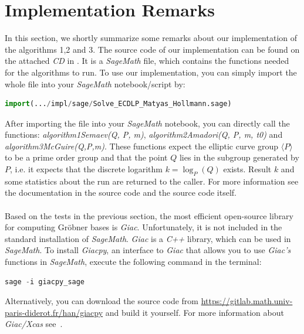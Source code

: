\documentclass[thesis=M,english]{FITthesis}[2012/10/20]
\theoremstyle{remark}
\theoremstyle{definition}
\begin{document}
\section{Implementation Remarks}
In this section, we shortly summarize some remarks about our implementation of the algorithms 1,2 and 3. The source code of our implementation can be found on the attached \textit{CD} in . It is a \textit{SageMath} file, which contains the functions needed for the algorithms to run. To use our implementation, you can simply import the whole file into your \textit{SageMath} notebook/script by:
\begin{lstlisting}[language=Python]
import(.../impl/sage/Solve_ECDLP_Matyas_Hollmann.sage)
\end{lstlisting}
After importing the file into your \textit{SageMath} notebook, you can directly call the functions: \textit{algorithm1Semaev(Q, P, m)}, \textit{algorithm2Amadori(Q, P, m, t0)} and \textit{algorithm3McGuire(Q,P,m)}.
These functions expect the elliptic curve group $\langle P \rangle$ to be a prime order group and that the point $Q$ lies in the subgroup generated by $P$, i.e. it expects that the discrete logarithm $k = \log_P(Q)$ exists. Result $k$ and some statistics about the run are returned to the caller. For more information see the documentation in the source code and the source code itself.
\\ \\
Based on the tests in the previous section, the most efficient open-source library for computing Gröbner bases is \textit{Giac}. Unfortunately, it is not included in the standard installation of \textit{SageMath}. \textit{Giac} is a \textit{C++} library, which can be used in \textit{SageMath}. To install \textit{Giacpy}, an interface to \textit{Giac} that allows you to use \textit{Giac's} functions in \textit{SageMath}, execute the following command in the terminal:
\begin{lstlisting}[language=Python]
sage -i giacpy_sage
\end{lstlisting}
Alternatively, you can download the source code from \url{https://gitlab.math.univ-paris-diderot.fr/han/giacpy} and build it yourself. For more information about \textit{Giac/Xcas} see~\cite{giac}.
\\ \\
\end{document}
